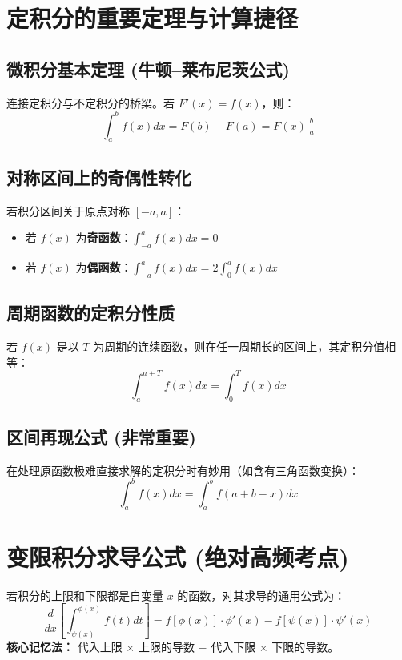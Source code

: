 \documentclass{article}
\begin{document}
\section{定积分的重要定理与计算捷径}

\subsection{微积分基本定理 (牛顿--莱布尼茨公式)}
连接定积分与不定积分的桥梁。若 $F'(x) = f(x)$，则：
\[ \int_{a}^{b} f(x) dx = F(b) - F(a) = \left. F(x) \right|_a^b \]

\subsection{对称区间上的奇偶性转化}
若积分区间关于原点对称 $[-a, a]$：
\begin{itemize}[leftmargin=1.5em]
    \item 若 $f(x)$ 为\textbf{奇函数}：$\int_{-a}^{a} f(x) dx = 0$
    \item 若 $f(x)$ 为\textbf{偶函数}：$\int_{-a}^{a} f(x) dx = 2 \int_{0}^{a} f(x) dx$
\end{itemize}

\subsection{周期函数的定积分性质}
若 $f(x)$ 是以 $T$ 为周期的连续函数，则在任一周期长的区间上，其定积分值相等：
\[ \int_{a}^{a+T} f(x)dx = \int_{0}^{T} f(x)dx \]

\subsection{区间再现公式 (非常重要)}
在处理原函数极难直接求解的定积分时有妙用（如含有三角函数变换）：
\[ \int_{a}^{b} f(x) dx = \int_{a}^{b} f(a+b-x) dx \]

\section{变限积分求导公式 (绝对高频考点)}
若积分的上限和下限都是自变量 $x$ 的函数，对其求导的通用公式为：
\[ \frac{d}{dx} \left[ \int_{\psi(x)}^{\phi(x)} f(t) dt \right] = f[\phi(x)] \cdot \phi'(x) - f[\psi(x)] \cdot \psi'(x) \]
\textbf{核心记忆法：} 代入上限 $\times$ 上限的导数 $-$ 代入下限 $\times$ 下限的导数。
\end{document}
